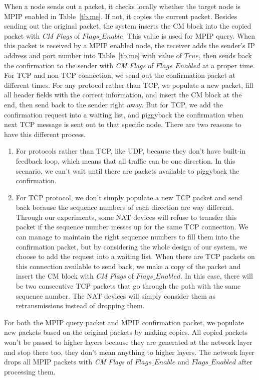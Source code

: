 When a node sends out a packet, it checks locally whether the target node is MPIP enabled in Table~\ref{tb.me}. If not, it 
copies the current packet. Besides sending out the original packet, the system inserts the CM block into the copied packet with \emph{CM Flags} of $Flags\_Enable$. This value is used for MPIP query. When this packet is received by a MPIP enabled node, the receiver adds the sender's IP address and port number into Table~\ref{tb.me} with value of $True$, then sends back the confirmation to the sender with \emph{CM Flags} of $Flags\_Enabled$ at a proper time. For TCP and non-TCP connection, we send out the confirmation packet at different times. For any protocol rather than TCP, we populate a new packet, fill all header fields with the correct information, and insert the CM block at the end, then send back to the sender right away. But for TCP, we add the confirmation request into a waiting list, and piggyback the confirmation when next TCP message is sent out to that specific node. There are two reasons to have this different process. 

\begin{enumerate}
\item For protocols rather than TCP, like UDP, because they don't have built-in feedback loop, which means that all traffic can be one direction. In this scenario, we can't wait until there are packets available to piggyback the confirmation.

\item For TCP protocol, we don't simply populate a new TCP packet and send back because the sequence numbers of each direction are way different. Through our experiments, some NAT devices will refuse to transfer this packet if the sequence number messes up for the same TCP connection. We can manage to maintain the right sequence numbers to fill them into the confirmation packet, but by considering the whole design of our system, we choose to add the request into a waiting list. When there are TCP packets on this connection available to send back, we make a copy of the packet and insert the CM block with \emph{CM Flags} of $Flags\_Enabled$. In this case, there will be two consecutive TCP packets that go through the path with the same sequence number. The NAT devices will simply consider them as retransmissions instead of dropping them.
\end{enumerate}

For both the MPIP query packet and MPIP confirmation packet, we populate new packets based on the original packets by making copies. All copied packets won't be passed to higher layers because they are generated at the network layer and stop there too, they don't mean anything to higher layers. The network layer drops all MPIP packets with \emph{CM Flags} of $Flags\_Enable$ and $Flags\_Enabled$ after processing them.

